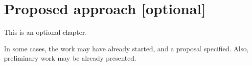 
\chapter{Proposed approach [optional]} %
\label{chap:Chapter3} %


This is an optional chapter. 

In some cases, the work may have already started, and a proposal specified. Also, preliminary work may be already presented. 



